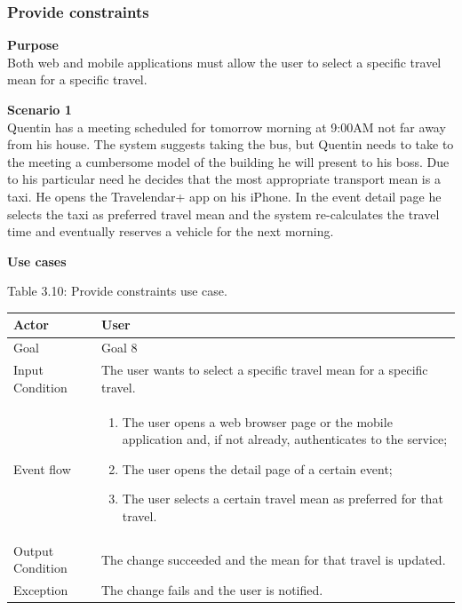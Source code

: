 \documentclass{article}
\begin{document}
	\subsubsection{Provide constraints}
	
	\bigskip
	\noindent
	\textbf{Purpose} \\
	Both web and mobile applications must allow the user to select a specific travel mean for a specific travel.
	
	\bigskip
	\noindent
	\textbf{Scenario 1} \\
	Quentin has a meeting scheduled for tomorrow morning at 9:00AM not far away from his house. The system suggests taking the bus, but Quentin needs to take to the meeting a cumbersome model of the building he will present to his boss. Due to his particular need he decides that the most appropriate transport mean is a taxi. He opens the Travelendar+ app on his iPhone. In the event detail page he selects the taxi as preferred travel mean and the system re-calculates the travel time and eventually reserves a vehicle for the next morning.
	
	\bigskip
	\noindent
	\textbf{Use cases} \\
	
	\begin{center}
		Table 3.10: Provide constraints use case.
		
		\bigskip
  		\begin{tabular}{p{}|p{}}
   		 	\hline
    			Actor & User \\ \hline
    			Goal & Goal 8 \\ \hline
    			Input Condition & The user wants to select a specific travel mean for a specific travel. \\ \hline
    			Event flow & 
			\begin{enumerate}
  				\item The user opens a web browser page or the mobile application and, if not already, authenticates to the service;
  				\item The user opens the detail page of a certain event;
  				\item The user selects a certain travel mean as preferred for that travel.
 			 \end{enumerate} \\ \hline
    			Output Condition & The change succeeded and the mean for that travel is updated. \\ \hline
    			Exception & The change fails and the user is notified. \\ \hline
    		\end{tabular}
	\end{center}
	
\end{document}
